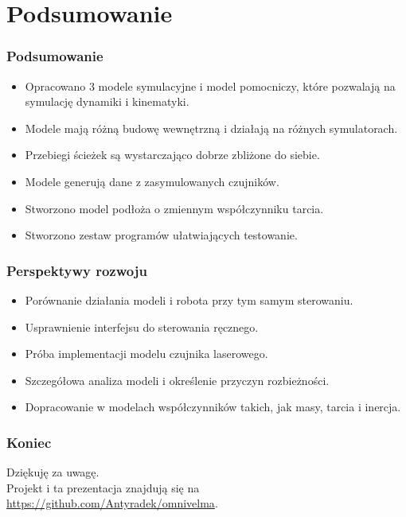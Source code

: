 \documentclass{beamer}
\begin{document}
	\section{Podsumowanie}
	\begin{frame}
		\frametitle{Podsumowanie}
		\begin{itemize}
			\item Opracowano 3 modele symulacyjne i model pomocniczy, które pozwalają na symulację dynamiki i kinematyki.
			\item Modele mają różną budowę wewnętrzną i działają na różnych symulatorach.
			\item Przebiegi ścieżek są wystarczająco dobrze zbliżone do siebie.
			\item Modele generują dane z zasymulowanych czujników.
			\item Stworzono model podłoża o zmiennym współczynniku tarcia.
			\item Stworzono zestaw programów ułatwiających testowanie.
		\end{itemize}
	\end{frame}
	\begin{frame}
		\frametitle{Perspektywy rozwoju}
		\begin{itemize}
			\item Porównanie działania modeli i robota przy tym samym sterowaniu.
			\item Usprawnienie interfejsu do sterowania ręcznego.
			\item Próba implementacji modelu czujnika laserowego.
			\item Szczegółowa analiza modeli i określenie przyczyn rozbieżności.
			\item Dopracowanie w modelach współczynników takich, jak masy, tarcia i inercja.
		\end{itemize}
	\end{frame}
	\begin{frame}
		\frametitle{Koniec}
		\centering
		Dziękuję za uwagę.\\
		Projekt i ta prezentacja znajdują się na \url{https://github.com/Antyradek/omnivelma}.
	\end{frame}
\end{document}

